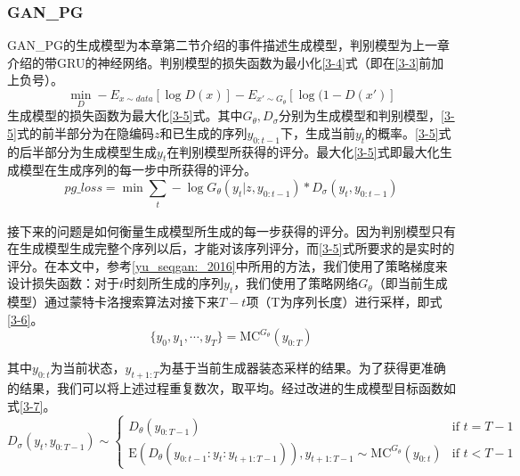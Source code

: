 \documentclass[]{template}
\begin{document}
\subsubsection{GAN\_PG}
GAN\_PG的生成模型为本章第二节介绍的事件描述生成模型，判别模型为上一章介绍的带GRU的神经网络。判别模型的损失函数为最小化\ref{3-4}式（即在\ref{3-3}前加上负号）。
\begin{equation}\label{3-4}
    \mathop{min}_D-E_{x\sim data}[\log D(x)]-E_{x'\sim G_\theta}[\log(1-D(x')]
\end{equation}
生成模型的损失函数为最大化\ref{3-5}式。其中$G_\theta,D_\sigma$分别为生成模型和判别模型，\ref{3-5}式的前半部分为在隐编码$z$和已生成的序列$y_{0:t-1}$下，生成当前$y_t$的概率。\ref{3-5}式的后半部分为生成模型生成$y_t$在判别模型所获得的评分。最大化\ref{3-5}式即最大化生成模型在生成序列的每一步中所获得的评分。
\begin{equation}\label{3-5}
pg\_loss=\mathop{min}\sum_{\substack{t}}-\log G_\theta (y_t|z,y_{0:t-1})*D_\sigma (y_t,y_{0:t-1})
\end{equation}

接下来的问题是如何衡量生成模型所生成的每一步获得的评分。因为判别模型只有在生成模型生成完整个序列以后，才能对该序列评分，而\ref{3-5}式所要求的是实时的评分。在本文中，参考\ref{yu_seqgan:_2016}中所用的方法，我们使用了策略梯度来设计损失函数：对于$t$时刻所生成的序列$y_t$，我们使用了策略网络$G_\theta$（即当前生成模型）通过蒙特卡洛搜索算法对接下来$T-t$项（T为序列长度）进行采样，即式\ref{3-6}。
\begin{equation}\label{3-6}
    \{y_0,y_1,\dotsb,y_T\}=\mathrm{MC}^{G_\theta}(y_{0:T})
\end{equation}

其中$y_{0:t}$为当前状态，$y_{t+1:T}$为基于当前生成器装态采样的结果。为了获得更准确的结果，我们可以将上述过程重复数次，取平均。经过改进的生成模型目标函数如式\ref{3-7}。
\begin{equation}\label{3-7}
D_\sigma(y_t,y_{0:T-1})\sim 
\begin{cases}
    D_\theta(y_{0:T-1}) & \text{if } t =T-1 \\
    \mathrm{E}(D_\theta(y_{0:t-1}:y_t:y_{t+1:T-1})),y_{t+1:T-1}\sim \mathrm{MC}^{G_\theta}(y_{0:t}) & \text{if }t<T-1
\end{cases}
\end{equation}
\end{document}
